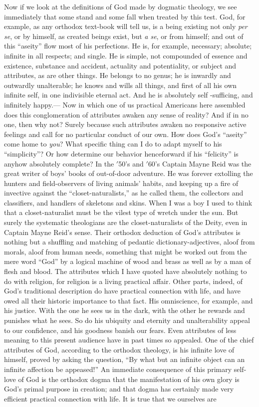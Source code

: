 \documentclass[12pt]{article}
\begin{document}
Now if we look at the definitions of God made by dogmatic theology, we see immediately that some stand and some fall when treated by this test. God, for example, as any orthodox text-book will tell us, is a being existing not only \emph{per se}, or by himself, as created beings exist, but \emph{a se}, or from himself; and out of this ``aseity'' flow most of his perfections. He is, for example, necessary; absolute; infinite in all respects; and single. He is simple, not compounded of essence and existence, substance and accident, actuality and potentiality, or subject and attributes, as are other things. He belongs to no genus; he is inwardly and outwardly unalterable; he knows and wills all things, and first of all his own infinite self, in one indivisible eternal act. And he is absolutely self -sufficing, and infinitely happy.--- Now in which one of us practical Americans here assembled does this conglomeration of attributes awaken any sense of reality? And if in no one, then why not? Surely because such attributes awaken no responsive active feelings and call for no particular conduct of our own. How does God's ``aseity'' come home to \emph{you}? What specific thing can I do to adapt myself to his ``simplicity''? Or how determine our behavior henceforward if his ``felicity'' is anyhow absolutely complete? In the $'$50's and $'$60's Captain Mayne Reid was the great writer of boys' books of out-of-door adventure. He was forever extolling the hunters and field-observers of living animals' habits, and keeping up a fire of invective against the ``closet-naturalists,'' as he called them, the collectors and classifiers, and handlers of skeletons and skins. When I was a boy I used to think that a closet-naturalist must be the vilest type of wretch under the sun. But surely the systematic theologians are the closet-naturalists of the Deity, even in Captain Mayne Reid's sense. Their orthodox deduction of God's attributes is nothing but a shuffling and matching of pedantic dictionary-adjectives, aloof from morals, aloof from human needs, something that might be worked out from the mere word ``God'' by a logical machine of wood and brass as well as by a man of flesh and blood. The attributes which I have quoted have absolutely nothing to do with religion, for religion is a living practical affair. Other parts, indeed, of God's traditional description do have practical connection with life, and have owed all their historic importance to that fact. His omniscience, for example, and his justice. With the one he sees us in the dark, with the other he rewards and punishes what he sees. So do his ubiquity and eternity and unalterability appeal to our confidence, and his goodness banish our fears. Even attributes of less meaning to this present audience have in past times so appealed. One of the chief attributes of God, according to the orthodox theology, is his infinite love of himself, proved by asking the question, ``By what but an infinite object can an infinite affection be appeased!'' An immediate consequence of this primary self-love of God is the orthodox dogma that the manifestation of his own glory is God's primal purpose in creation; and that dogma has certainly made very efficient practical connection with life. It is true that we ourselves are 
\end{document}
